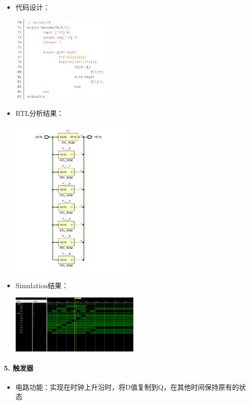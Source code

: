 \documentclass[a4,10pt,zihao=-4]{ctexart}
\begin{document}
\begin{itemize}
\item
  代码设计：
  
  \includegraphics[width=0.4\textwidth]{DECODER_Code.png}
\item
  RTL分析结果：
  
  \includegraphics[width=0.5\textwidth]{DECODER_RTL.png}
\item
  Simulation结果：
  
  \includegraphics[width=0.5\textwidth]{DECODER_Simulation.png}
\end{itemize}

\paragraph{5. 触发器}

\begin{itemize}
\item
  电路功能：实现在时钟上升沿时，将D值复制到Q，在其他时间保持原有的状态
\end{itemize}
\end{document}
